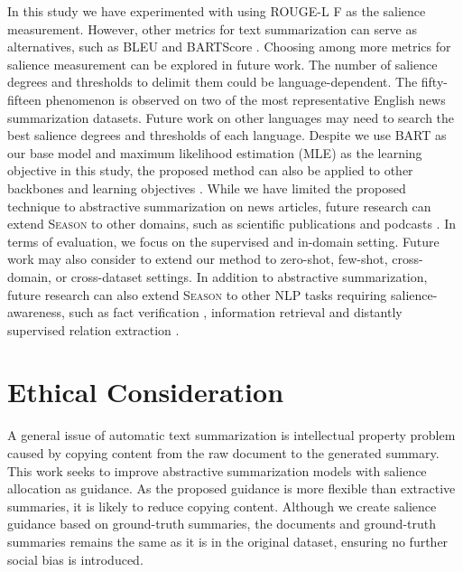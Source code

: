 \documentclass[11pt]{article}
\newcommand{\MODEL}{\mbox{\textsc{Season}}\xspace}
\begin{document}
In this study we have experimented with using ROUGE-L F as the salience measurement. However, other metrics for text summarization can serve as alternatives, such as BLEU \cite{papineni2002bleu} and BARTScore \cite{yuan2021bartscore}. Choosing among more metrics for salience measurement can be explored in future work.
The number of salience degrees and thresholds to delimit them could be language-dependent. The fifty-fifteen phenomenon is observed on two of the most representative English news summarization datasets. Future work on other languages may need to search the best salience degrees and thresholds of each language.
Despite we use BART as our base model and maximum likelihood estimation (MLE) as the learning objective in this study, the proposed method can also be applied to other backbones and learning objectives \cite{zhang2020pegasus,liu2021simcls,liu2022brio}.
While we have limited the proposed technique to abstractive summarization on news articles, future research can extend \MODEL to other domains, such as scientific publications \cite{cohan2018discourse} and podcasts \cite{song2022towards}.
In terms of evaluation, we focus on the supervised and in-domain setting. Future work may also consider to extend our method to zero-shot, few-shot, cross-domain, or cross-dataset settings.
In addition to abstractive summarization, future research can also extend \MODEL to other NLP tasks requiring salience-awareness, such as fact verification \cite{wang2021table}, information retrieval \cite{xiong2018towards} and distantly supervised relation extraction \cite{lin2016neural}.


 \section*{Ethical Consideration}
A general issue of automatic text summarization is intellectual property problem caused by copying content from the raw document to the generated summary. 
This work seeks to improve abstractive summarization models with salience allocation as guidance.
As the proposed guidance is more flexible than extractive summaries, it is likely to reduce copying content.
Although we create salience guidance based on ground-truth summaries, the documents and ground-truth summaries remains the same as it is in the original dataset, ensuring no further social bias is introduced. 

 



\clearpage
\appendix
\end{document}
